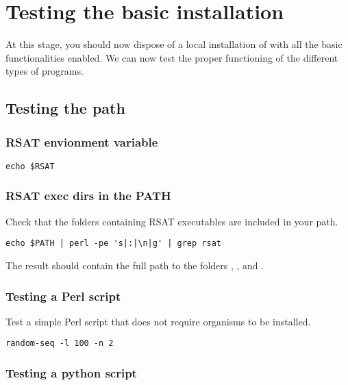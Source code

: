 \documentclass[12pt,a4paper, oneside]{scrreprt} %
\begin{document}
\section{Testing the basic installation}

At this stage, you should now dispose of a local installation of \RSAT
with all the basic functionalities enabled. We can now test the proper
functioning of the different types of programs.

\subsection{Testing the path}

\subsubsection{RSAT envionment variable}

\begin{lstlisting}
echo $RSAT
\end{lstlisting}

\subsubsection{RSAT exec dirs in the PATH}

Check that the folders containing RSAT executables are included in
your path.

\begin{lstlisting}
echo $PATH | perl -pe 's|:|\n|g' | grep rsat
\end{lstlisting}

The result should contain the full path to the folders ,
, and .

\subsubsection{Testing a \RSAT Perl script}

Test a simple Perl script that does not require organisms to be
installed.

\begin{lstlisting}
random-seq -l 100 -n 2
\end{lstlisting}

\subsubsection{Testing a \RSAT python script}
\end{document}
